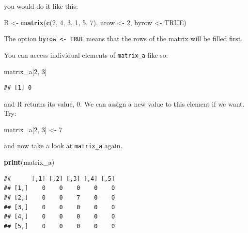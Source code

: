 \documentclass[]{gitbook}
\newenvironment{Shaded}{\begin{snugshade}}{\end{snugshade}}
\newcommand{\DecValTok}[1]{\textcolor[rgb]{0.00,0.00,0.81}{#1}}
\newcommand{\KeywordTok}[1]{\textcolor[rgb]{0.13,0.29,0.53}{\textbf{#1}}}
\newcommand{\NormalTok}[1]{#1}
\newcommand{\OtherTok}[1]{\textcolor[rgb]{0.56,0.35,0.01}{#1}}
\newcommand{\StringTok}[1]{\textcolor[rgb]{0.31,0.60,0.02}{#1}}
\theoremstyle{definition}
\theoremstyle{definition}
\theoremstyle{definition}
\theoremstyle{remark}
\begin{document}
you would do it like this:

\begin{Shaded}
\begin{Highlighting}[]
\NormalTok{B <-}\StringTok{ }\KeywordTok{matrix}\NormalTok{(}\KeywordTok{c}\NormalTok{(}\DecValTok{2}\NormalTok{, }\DecValTok{4}\NormalTok{, }\DecValTok{3}\NormalTok{, }\DecValTok{1}\NormalTok{, }\DecValTok{5}\NormalTok{, }\DecValTok{7}\NormalTok{), nrow <-}\StringTok{ }\DecValTok{2}\NormalTok{, byrow <-}\StringTok{ }\OtherTok{TRUE}\NormalTok{)}
\end{Highlighting}
\end{Shaded}

The option \texttt{byrow\ \textless{}-\ TRUE} means that the rows of the
matrix will be filled first.

You can access individual elements of \texttt{matrix\_a} like so:

\begin{Shaded}
\begin{Highlighting}[]
\NormalTok{matrix_a[}\DecValTok{2}\NormalTok{, }\DecValTok{3}\NormalTok{]}
\end{Highlighting}
\end{Shaded}

\begin{verbatim}
## [1] 0
\end{verbatim}

and R returns its value, 0. We can assign a new value to this element if
we want. Try:

\begin{Shaded}
\begin{Highlighting}[]
\NormalTok{matrix_a[}\DecValTok{2}\NormalTok{, }\DecValTok{3}\NormalTok{] <-}\StringTok{ }\DecValTok{7}
\end{Highlighting}
\end{Shaded}

and now take a look at \texttt{matrix\_a} again.

\begin{Shaded}
\begin{Highlighting}[]
\KeywordTok{print}\NormalTok{(matrix_a)}
\end{Highlighting}
\end{Shaded}

\begin{verbatim}
##      [,1] [,2] [,3] [,4] [,5]
## [1,]    0    0    0    0    0
## [2,]    0    0    7    0    0
## [3,]    0    0    0    0    0
## [4,]    0    0    0    0    0
## [5,]    0    0    0    0    0
\end{verbatim}
\end{document}
